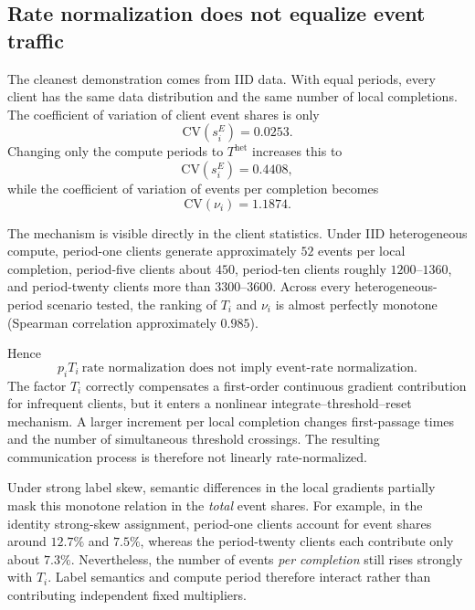 \subsection{Rate normalization does not equalize event traffic}

The cleanest demonstration comes from IID data. With equal periods, every client has the same data distribution and the same number of local completions. The coefficient of variation of client event shares is only
\begin{equation}
\mathrm{CV}(s_i^E)=0.0253.
\end{equation}
Changing only the compute periods to $T^{\mathrm{het}}$ increases this to
\begin{equation}
\boxed{\mathrm{CV}(s_i^E)=0.4408},
\end{equation}
while the coefficient of variation of events per completion becomes
\begin{equation}
\boxed{\mathrm{CV}(\nu_i)=1.1874}.
\end{equation}

The mechanism is visible directly in the client statistics. Under IID heterogeneous compute, period-one clients generate approximately $52$ events per local completion, period-five clients about $450$, period-ten clients roughly $1200$--$1360$, and period-twenty clients more than $3300$--$3600$. Across every heterogeneous-period scenario tested, the ranking of $T_i$ and $\nu_i$ is almost perfectly monotone (Spearman correlation approximately $0.985$).

Hence
\begin{equation}
\boxed{
p_iT_i\ \text{rate normalization does not imply event-rate normalization.}
}
\end{equation}
The factor $T_i$ correctly compensates a first-order continuous gradient contribution for infrequent clients, but it enters a nonlinear integrate--threshold--reset mechanism. A larger increment per local completion changes first-passage times and the number of simultaneous threshold crossings. The resulting communication process is therefore not linearly rate-normalized.

Under strong label skew, semantic differences in the local gradients partially mask this monotone relation in the \emph{total} event shares. For example, in the identity strong-skew assignment, period-one clients account for event shares around $12.7\%$ and $7.5\%$, whereas the period-twenty clients each contribute only about $7.3\%$. Nevertheless, the number of events \emph{per completion} still rises strongly with $T_i$. Label semantics and compute period therefore interact rather than contributing independent fixed multipliers.

